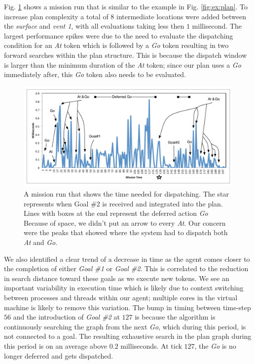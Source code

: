 Fig. \ref{fig:example_run} shows a mission run that is similar to the
example in Fig. \ref{fig:ex:plan}.  To increase plan complexity a
total of $8$ intermediate locations were added between the {\em
  surface} and {\em vent 1}, with all evaluations taking less then $1$
millisecond. The largest performance spikes were due to the need to
evaluate the dispatching condition for an {\em At} token which is
followed by a {\em Go} token resulting in two forward searches within
the plan structure. This is because the dispatch window is larger than
the minimum duration of the {\em At} token; since our plan uses a {\em
  Go} immediately after, this \emph{Go} token also needs to be
evaluated.

\begin{figure}[t]
  \centering
  \vskip-3mm
  \includegraphics[width=1.2\columnwidth]{figs/example_run.pdf}
  \vskip-2mm
  \caption{\small A mission run that shows the time needed for
    dispatching. The star represents when Goal \#2 is received and
    integrated into the plan. Lines with boxes at the end represent
    the deferred action {\em Go} Because of space, we didn't put an
    arrow to every {\em At}. Our concern were the peaks that showed
    where the system had to dispatch both {\em At} and {\em Go}. }
  \label{fig:example_run}
  \vskip-2mm
\end{figure}


We also identified a clear trend of a decrease in time as the agent
comes closer to the completion of either {\em Goal \#1} or {\em Goal
  \#2}. This is correlated to the reduction in search distance toward
these goals as we execute new tokens.  We see an important
variability in execution time which is likely due to context switching
between processes and threads within our agent; multiple cores in the
virtual machine is likely to remove this variation.  The bump in
timing between time-step $56$ and the introduction of {\em Goal \#2}
at $127$ is because the algorithm is continuously searching the graph
from the next {\em Go}, which during this period, is not connected to
a goal. The resulting exhaustive search in the plan
graph during this period is on an average above $0.2$ milliseconds. At
tick $127$, the {\em Go} is no longer deferred and gets dispatched.

